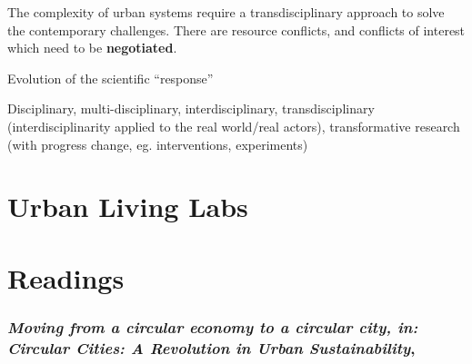 \documentclass{article}
\begin{document}
The complexity of urban systems require a transdisciplinary approach to solve the contemporary challenges. There are resource conflicts, and conflicts of interest which need to be \textbf{negotiated}.

Evolution of the scientific ``response'' 

Disciplinary, multi-disciplinary, interdisciplinary, transdisciplinary (interdisciplinarity applied to the real world/real actors), transformative research (with progress change, eg. interventions, experiments)


\section{Urban Living Labs}


\begin{outline}
	\1 
\end{outline}

\begin{outline}
	\1 
\end{outline}

\pagebreak
\section{Readings}

\subsubsection{\textit{Moving from a circular economy to a circular city, in: Circular Cities: A Revolution in Urban Sustainability}, \parencite{williams2021circular}}
\end{document}

